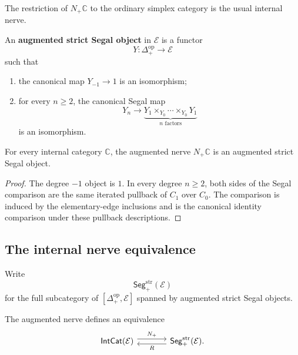 The restriction of \(N_+\mathbb C\) to the ordinary simplex category is the
usual internal nerve.

\begin{definition}
\label{def:augmented-strict-segal-object}
An \textbf{augmented strict Segal object} in \(\mathcal E\) is a functor
\[
    Y:\Delta_+^{\mathrm{op}}\to\mathcal E
\]
such that
\begin{enumerate}
    \item the canonical map \(Y_{-1}\to1\) is an isomorphism;
    \item for every \(n\geq2\), the canonical Segal map
    \[
        Y_n
        \longrightarrow
        \underbrace{
        Y_1\times_{Y_0}\cdots\times_{Y_0}Y_1
        }_{n\text{ factors}}
    \]
    is an isomorphism.
\end{enumerate}
\end{definition}

\begin{proposition}
\label{prop:strict-segal-isomorphisms}
For every internal category \(\mathbb C\), the augmented nerve
\(N_+\mathbb C\) is an augmented strict Segal object.
\end{proposition}

\begin{proof}
The degree \(-1\) object is \(1\). In every degree \(n\geq2\), both sides of
the Segal comparison are the same iterated pullback of \(C_1\) over \(C_0\).
The comparison is induced by the elementary-edge inclusions and is the
canonical identity comparison under these pullback descriptions.
\end{proof}

\subsection{The internal nerve equivalence}
\label{subsec:internal-nerve-equivalence}

Write
\[
    \mathsf{Seg}^{\mathrm{str}}_+(\mathcal E)
\]
for the full subcategory of
\([
    \Delta_+^{\mathrm{op}},\mathcal E
]\)
spanned by augmented strict Segal objects.

\begin{theorem}
\label{thm:internal-nerve-equivalence}
The augmented nerve defines an equivalence
\[
\begin{tikzcd}[column sep=large]
    \mathsf{IntCat}(\mathcal E)
        \arrow[r, shift left=0.7ex, "N_+"]
    &
    \mathsf{Seg}^{\mathrm{str}}_+(\mathcal E)
        \arrow[l, shift left=0.7ex, "R"] .
\end{tikzcd}
\]
\end{theorem}

